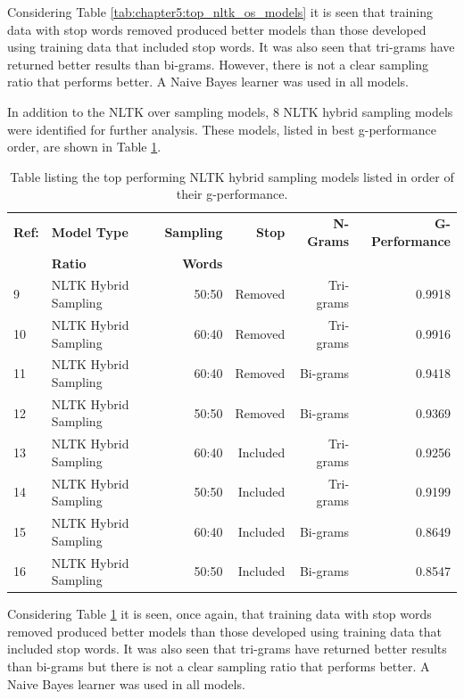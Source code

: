 Considering Table \ref{tab:chapter5:top_nltk_os_models} it is seen that training data with stop words removed produced better models than those developed using training data that included stop words. It was also seen that tri-grams have returned better results than bi-grams. However, there is not a clear sampling ratio that performs better. A Naive Bayes learner was used in all models.

In addition to the NLTK over sampling models, 8 NLTK hybrid sampling models were identified for further analysis. These models, listed in best g-performance order, are shown in Table \ref{tab:chapter5:top_nltk_hs_models}.

\begin{table}[h]
	\centering
	\caption[Top performing NLTK hybrid sampling models]{Table listing the top performing NLTK hybrid sampling models listed in order of their g-performance.}
	\label{tab:chapter5:top_nltk_hs_models}
	\begin{tabular}{llrrrr}
		\toprule
		\textbf{Ref:}  & \textbf{Model Type} & \textbf{Sampling} & \textbf{Stop}   & \textbf{N-Grams} & \textbf{G-Performance}  \\
		                    & \textbf{Ratio}    & \textbf{Words}  &                  &   \\
		\midrule
		9  & NLTK Hybrid Sampling & 50:50 & Removed & Tri-grams & 0.9918  \\
		10  & NLTK Hybrid Sampling & 60:40 & Removed & Tri-grams & 0.9916  \\
		11  & NLTK Hybrid Sampling & 60:40 & Removed & Bi-grams  & 0.9418  \\
		12  & NLTK Hybrid Sampling & 50:50 & Removed & Bi-grams  & 0.9369  \\
		13  & NLTK Hybrid Sampling & 60:40 & Included & Tri-grams & 0.9256  \\
		14  & NLTK Hybrid Sampling & 50:50 & Included & Tri-grams & 0.9199  \\
		15  & NLTK Hybrid Sampling & 60:40 & Included & Bi-grams & 0.8649  \\
		16  & NLTK Hybrid Sampling & 50:50 & Included & Bi-grams & 0.8547  \\
		\bottomrule
    \end{tabular}
\end{table}

Considering Table \ref{tab:chapter5:top_nltk_hs_models} it is seen, once again, that training data with stop words removed produced better models than those developed using training data that included stop words. It was also seen that tri-grams have returned better results than bi-grams but there is not a clear sampling ratio that performs better. A Naive Bayes learner was used in all models.

